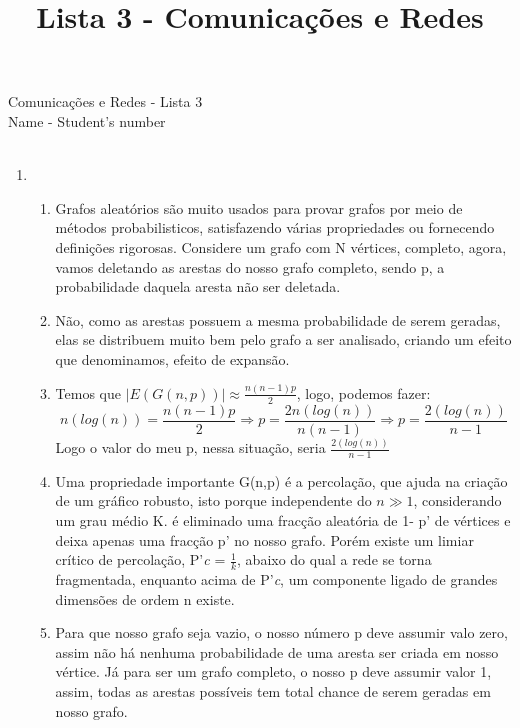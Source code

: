 \documentclass[11pt,reqno]{amsart}
\title {Lista 3 - Comunicações e Redes}
\author{}
\date{}
\begin{document}
	\begin{center}
		Comunicações e Redes - Lista 3\\
		Name - Student's number \\ \ \\
	\end{center}

	\begin{enumerate}

		\item

		\vspace{0.3cm}

		\begin{enumerate}
			\item Grafos aleatórios são muito usados para provar grafos por meio de métodos probabilisticos,
			 satisfazendo várias propriedades ou fornecendo definições rigorosas. Considere um grafo com 
			 N vértices, completo, agora, vamos deletando as arestas do nosso grafo completo, sendo p, a 
			 probabilidade daquela aresta não ser deletada.
			\item Não, como as arestas possuem a mesma probabilidade de serem geradas, elas se distribuem 
			muito bem pelo grafo a ser analisado, criando um efeito que denominamos, efeito de expansão.
			\item Temos que $|E(G(n,p))| \approx \frac{n(n-1)p}{2}$, logo, podemos fazer: \[n (log(n)) = 
			\frac{n(n-1)p}{2} \Rightarrow p = \frac{2 n(log(n))}{n(n-1)} \Rightarrow p = \frac{2(log(n))}{n-
			1}\] Logo o valor do meu p, nessa situação, seria $\frac{2(log(n))}{n-1}$
			\item Uma propriedade importante G(n,p) é a percolação, que ajuda na criação de um gráfico 
			robusto, isto porque independente do $n \gg 1$, considerando um grau médio K. é eliminado uma 
			fracção aleatória de 1- p' de vértices e deixa apenas uma fracção p' no nosso grafo.
			Porém existe um limiar crítico de percolação, P'\textit{c} = $\frac{1}{k}$, abaixo do qual 
			a rede se torna fragmentada, enquanto acima de P'\textit{c}, um componente ligado de grandes 
			dimensões de ordem n existe.
			\item Para que nosso grafo seja vazio, o nosso número p deve assumir valo zero, assim não
			há nenhuma probabilidade de uma aresta ser criada em nosso vértice. Já para ser um grafo 
			completo, o nosso p deve assumir valor 1, assim, todas as arestas possíveis tem total chance
			de serem geradas em nosso grafo.
		\end{enumerate}


\end{enumerate}
\end{document}
